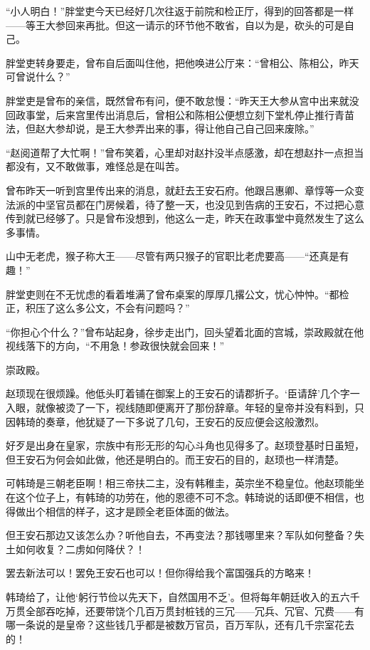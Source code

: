 “小人明白！”胖堂吏今天已经好几次往返于前院和检正厅，得到的回答都是一样——等王大参回来再批。但这一请示的环节他不敢省，自以为是，砍头的可是自己。

胖堂吏转身要走，曾布自后面叫住他，把他唤进公厅来：“曾相公、陈相公，昨天可曾说什么？”

胖堂吏是曾布的亲信，既然曾布有问，便不敢怠慢：“昨天王大参从宫中出来就没回政事堂，后来宫里传出消息后，曾相公和陈相公便想立刻下堂札停止推行青苗法，但赵大参却说，是王大参弄出来的事，得让他自己自己回来废除。”

“赵阅道帮了大忙啊！”曾布笑着，心里却对赵抃没半点感激，却在想赵抃一点担当都没有，又不敢做事，难怪总是在叫苦。

曾布昨天一听到宫里传出来的消息，就赶去王安石府。他跟吕惠卿、章惇等一众变法派的中坚官员都在门房候着，待了整一天，也没见到告病的王安石，不过把心意传到就已经够了。只是曾布没想到，他这么一走，昨天在政事堂中竟然发生了这么多事情。

山中无老虎，猴子称大王——尽管有两只猴子的官职比老虎要高——“还真是有趣！”

胖堂吏则在不无忧虑的看着堆满了曾布桌案的厚厚几撂公文，忧心忡忡。“都检正，积压了这么多公文，不会有问题吗？”

“你担心个什么？”曾布站起身，徐步走出门，回头望着北面的宫城，崇政殿就在他视线落下的方向，“不用急！参政很快就会回来！”

崇政殿。

赵顼现在很烦躁。他低头盯着铺在御案上的王安石的请郡折子。‘臣请辞’几个字一入眼，就像被烫了一下，视线随即便离开了那份辞章。年轻的皇帝并没有料到，只因韩琦的奏章，他犹疑了一下多说了几句，王安石的反应便会这般激烈。

好歹是出身在皇家，宗族中有形无形的勾心斗角也见得多了。赵顼登基时日虽短，但王安石为何会如此做，他还是明白的。而王安石的目的，赵顼也一样清楚。

可韩琦是三朝老臣啊！相三帝扶二主，没有韩稚圭，英宗坐不稳皇位。他赵顼能坐在这个位子上，有韩琦的功劳在，他的恩德不可不念。韩琦说的话即便不相信，也得做出个相信的样子，这才是顾全老臣体面的做法。

但王安石那边又该怎么办？听他自去，不再变法？那钱哪里来？军队如何整备？失土如何收复？二虏如何降伏？！

罢去新法可以！罢免王安石也可以！但你得给我个富国强兵的方略来！

韩琦给了，让他‘躬行节俭以先天下，自然国用不乏’。但将每年朝廷收入的五六千万贯全部吞吃掉，还要带饶个几百万贯封桩钱的三冗——冗兵、冗官、冗费——有哪一条说的是皇帝？这些钱几乎都是被数万官员，百万军队，还有几千宗室花去的！

